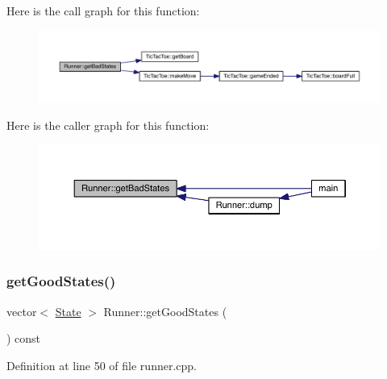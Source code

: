Here is the call graph for this function\+:\nopagebreak
\begin{figure}[H]
\begin{center}
\leavevmode
\includegraphics[width=350pt]{class_runner_ae3105a026f21ed05a8c022857cd12617_cgraph}
\end{center}
\end{figure}
Here is the caller graph for this function\+:\nopagebreak
\begin{figure}[H]
\begin{center}
\leavevmode
\includegraphics[width=350pt]{class_runner_ae3105a026f21ed05a8c022857cd12617_icgraph}
\end{center}
\end{figure}
\mbox{\label{class_runner_a2d1297463b5825f5afa1e3e502919698}} 
\subsubsection{\texorpdfstring{get\+Good\+States()}{getGoodStates()}}
{\footnotesize\ttfamily vector$<$ \hyperlink{constants_8h_afd2599a4148deb913a46b4e2eba9e68a}{State} $>$ Runner\+::get\+Good\+States (\begin{DoxyParamCaption}{ }\end{DoxyParamCaption}) const}



Definition at line 50 of file runner.\+cpp.


